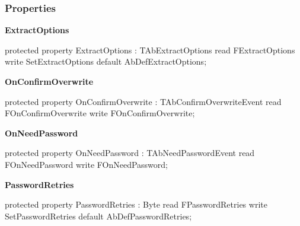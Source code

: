 \documentclass{report}
\newif\ifpdf
\begin{document}
\subsubsection*{\large{\textbf{Properties}}\normalsize\hspace{1ex}\hfill}
\begin{list}{}{
\setlength{\itemindent}{0cm}
\setlength{\listparindent}{0cm}
\setlength{\leftmargin}{\evensidemargin}
\addtolength{\leftmargin}{\tmplength}
\settowidth{\labelsep}{X}
\addtolength{\leftmargin}{\labelsep}
\setlength{\labelwidth}{\tmplength}
}
\label{AbUnzper.TAbCustomUnZipper-ExtractOptions}
\item[\textbf{ExtractOptions}\hfill]
\ifpdf
\begin{flushleft}
\fi
\begin{ttfamily}
protected property ExtractOptions : TAbExtractOptions
      read  FExtractOptions
      write SetExtractOptions
      default AbDefExtractOptions;\end{ttfamily}

\ifpdf
\end{flushleft}
\fi


\par  \label{AbUnzper.TAbCustomUnZipper-OnConfirmOverwrite}
\item[\textbf{OnConfirmOverwrite}\hfill]
\ifpdf
\begin{flushleft}
\fi
\begin{ttfamily}
protected property OnConfirmOverwrite : TAbConfirmOverwriteEvent
      read  FOnConfirmOverwrite
      write FOnConfirmOverwrite;\end{ttfamily}

\ifpdf
\end{flushleft}
\fi


\par  \label{AbUnzper.TAbCustomUnZipper-OnNeedPassword}
\item[\textbf{OnNeedPassword}\hfill]
\ifpdf
\begin{flushleft}
\fi
\begin{ttfamily}
protected property OnNeedPassword : TAbNeedPasswordEvent
      read  FOnNeedPassword
      write FOnNeedPassword;\end{ttfamily}

\ifpdf
\end{flushleft}
\fi


\par  \label{AbUnzper.TAbCustomUnZipper-PasswordRetries}
\item[\textbf{PasswordRetries}\hfill]
\ifpdf
\begin{flushleft}
\fi
\begin{ttfamily}
protected property PasswordRetries : Byte
      read  FPasswordRetries
      write SetPasswordRetries
      default AbDefPasswordRetries;\end{ttfamily}

\ifpdf
\end{flushleft}
\fi


\par  \end{list}
\end{document}
